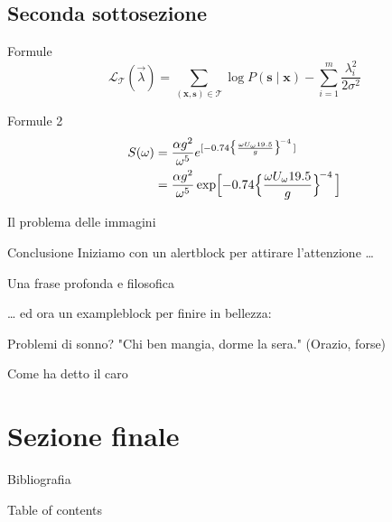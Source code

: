 \documentclass{beamer}
\begin{document}
\subsection{Seconda sottosezione}

\begin{frame}{Formule}
    \[
    \mathcal L_{\mathcal T}(\vec{\lambda})
    = \sum_{(\mathbf{x},\mathbf{s})\in \mathcal T}
       \log P(\mathbf{s}\mid\mathbf{x}) - \sum_{i=1}^m
       \frac{\lambda_i^2}{2\sigma^2}
    \]
\end{frame}

\begin{frame}{Formule 2}
    \begin{align*}
        S(\omega) 
        &= \frac{\alpha g^2}{\omega^5} e^{[ -0.74\bigl\{\frac{\omega U_\omega         19.5}{g}\bigr\}^{\!-4}\,]} \\
        &= \frac{\alpha g^2}{\omega^5} \exp\Bigl[ -0.74\Bigl\{\frac{\omega       U_\omega 19.5}{g}\Bigr\}^{\!-4}\,\Bigr] 
    \end{align*}
\end{frame}


\begin{frame}{Il problema delle immagini}
\end{frame}

\begin{frame}{Conclusione}
    Iniziamo con un alertblock per attirare l'attenzione \dots
    \begin{alertblock}{Una frase profonda e filosofica}
        \lipsum[66]
    \end{alertblock}
\end{frame}
\begin{frame}{}
    \dots
    ed ora un exampleblock per finire in bellezza:
    \begin{exampleblock}{Problemi di sonno?}
        "Chi ben mangia, dorme la sera." 
        \flushright
        (Orazio, forse)
    \end{exampleblock}
\end{frame}

\begin{frame}
	\nocite{CF} Come ha detto il caro \cite{RAM} \newline
	\pause
\end{frame}

\section{Sezione finale}

\begin{frame}{Bibliografia}
	\printbibliography[heading=none]
\end{frame}

\begin{frame}{Table of contents}
	\tableofcontents
\end{frame}
\end{document}
